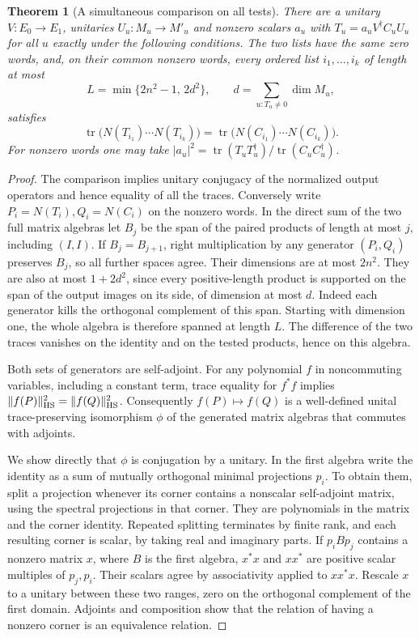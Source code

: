 \documentclass[a4paper,11pt]{article}
\newtheorem{theorem}[proposition]{Theorem}
\theoremstyle{definition}
\theoremstyle{remark}
\numberwithin{equation}{section}
\begin{document}
\begin{theorem}[A simultaneous comparison on all tests]\leavevmode
\label{thm:commonunitary318}
There are a unitary \(V:E_0\to E_1\), unitaries
\(U_u:M_u\to M'_u\) and nonzero scalars \(a_u\) with
\(T_u=a_u V^\dagger C_u U_u\) for all \(u\) exactly under
the following conditions. The two lists have the same zero
words, and, on their common nonzero words, every ordered
list \(i_1,\ldots,i_k\) of length at most
\[
       L=\min\{2n^2-1,\,2d^2\},\qquad
       d=\sum_{u:T_u\ne0}\dim M_u ,
\]
satisfies
\[
 \operatorname{tr}\bigl(N(T_{i_1})\cdots N(T_{i_k})\bigr)
   =\operatorname{tr}\bigl(N(C_{i_1})\cdots N(C_{i_k})\bigr).
\]
For nonzero words one may take
\(|a_u|^2=\operatorname{tr}(T_uT_u^\dagger)/
                    \operatorname{tr}(C_uC_u^\dagger)\).
\end{theorem}
\begin{proof}
The comparison implies unitary conjugacy of the normalized
output operators and hence equality of all the traces.
Conversely write \(P_i=N(T_i), Q_i=N(C_i)\) on the nonzero
words. In the direct sum of the two full matrix algebras
let \(B_j\) be the span of the paired products of length
at most \(j\), including \((I,I)\). If \(B_j=B_{j+1}\),
right multiplication by any generator \((P_i,Q_i)\)
preserves \(B_j\), so all further spaces agree. Their
dimensions are at most \(2n^2\). They are also at most
\(1+2d^2\), since every positive-length product is supported
on the span of the output images on its side, of dimension
at most \(d\). Indeed each generator kills the orthogonal
complement of this span. Starting with dimension one,
the whole algebra is therefore spanned at length \(L\).
The difference of the two traces vanishes on the identity
and on the tested products, hence on this algebra.

Both sets of generators are self-adjoint. For any polynomial
\(f\) in noncommuting variables, including a constant term,
trace equality for \(f^*f\) implies
\(\|f(P)\|_{\rm HS}^2=\|f(Q)\|_{\rm HS}^2\).
Consequently \(f(P)\mapsto f(Q)\) is a well-defined unital
trace-preserving isomorphism \(\phi\) of the generated matrix
algebras that commutes with adjoints.

We show directly that \(\phi\) is conjugation by a unitary.
In the first algebra write the identity as a sum of mutually
orthogonal minimal projections \(p_i\). To obtain them,
split a projection whenever its corner contains a nonscalar
self-adjoint matrix, using the spectral projections in that
corner. They are polynomials in the matrix and the corner
identity. Repeated splitting terminates by finite rank,
and each resulting corner is scalar, by taking real and
imaginary parts. If \(p_i B p_j\) contains a nonzero
matrix \(x\), where \(B\) is the first algebra, \(x^*x\)
and \(xx^*\) are positive scalar multiples of \(p_j,p_i\).
Their scalars agree by associativity applied to \(xx^*x\).
Rescale \(x\) to a unitary between these two ranges, zero
on the orthogonal complement of the first domain.
Adjoints and composition show that the relation of having
a nonzero corner is an equivalence relation.


\end{proof}
\end{document}
